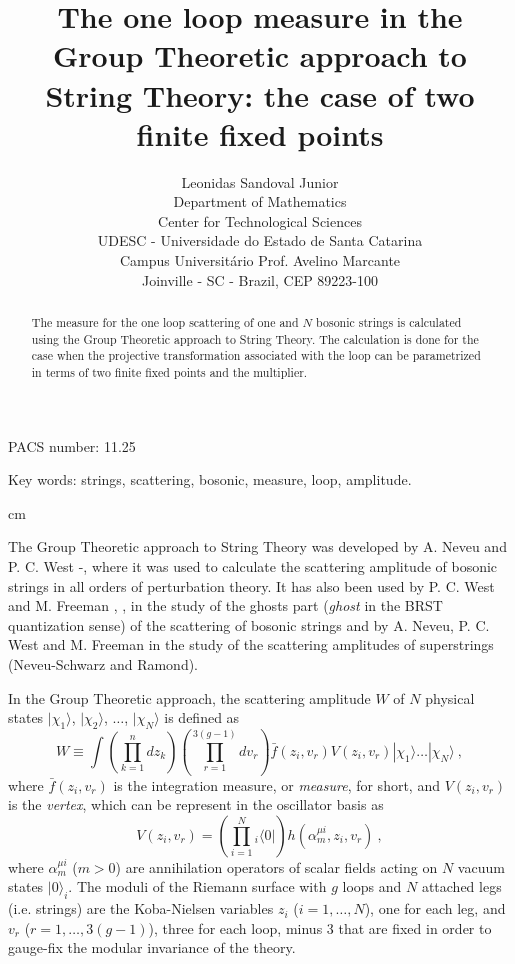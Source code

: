 \documentclass[a4paper,12pt]{article}
\begin{document}
\title{The one loop measure in the Group Theoretic approach to String Theory: the case of two finite fixed points}

\author{Leonidas Sandoval Junior\\ Department of Mathematics\\ Center for Technological
Sciences\\ UDESC - Universidade do Estado de Santa Catarina\\ Campus Universit\'ario Prof.
Avelino Marcante\\ Joinville - SC - Brazil, CEP 89223-100}

\maketitle

\begin{abstract}
The measure for the one loop scattering of one and $N$ bosonic strings is calculated using the Group Theoretic approach to String Theory. The calculation is done for the case when the
projective transformation associated with the loop can be parametrized in terms of two finite fixed points and the multiplier.
\end{abstract}

\noindent PACS number: 11.25

\noindent Key words: strings, scattering, bosonic, measure, loop, amplitude.

 cm

The Group Theoretic approach to String Theory was developed by A. Neveu and P. C. West
\cite{1}-\cite{5}, where it was used to calculate the scattering amplitude of bosonic strings in all orders of perturbation theory. It has also been used by P. C. West and M. Freeman \cite{6}, \cite{7}, in the study of the ghosts part ({\sl ghost} in the BRST quantization sense) of the scattering of bosonic strings and by A. Neveu, P. C. West and M. Freeman \cite{8} in the study of the scattering amplitudes of superstrings (Neveu-Schwarz and Ramond).

In the Group Theoretic approach, the scattering amplitude $W$ of $N$ physical states $|\chi
_1\rangle $, $|\chi _2\rangle $, $\dots $, $|\chi _N\rangle $ is defined as
\begin{equation}
W\equiv \int \left( \prod_{k=1}^ndz_k\right) \left( \prod_{r=1}^{3(g-1)}dv_r\right) \bar
f(z_i,v_r)V(z_i,v_r)|\chi _1\rangle \dots |\chi _N\rangle \ ,
\end{equation}
where $\bar f(z_i,v_r)$ is the integration measure, or {\sl measure}, for short, and
$V(z_i,v_r)$ is the {\sl vertex}, which can be represent in the oscillator basis as
\begin{equation}
V(z_i,v_r)=\left( \prod_{i=1}^N{ }_i\! \langle 0|\right) h(\alpha ^{\mu i}_m,z_i,v_r)\ ,
\end{equation}
where $\alpha ^{\mu i }_m$ ($m>0$) are annihilation operators of scalar fields acting on $N$
vacuum states $|0\rangle _i$. The moduli of the Riemann surface with $g$ loops and $N$
attached legs (i.e. strings) are the Koba-Nielsen variables $z_i$ ($i=1,\dots ,N$), one for
each leg, and $v_r$ ($r=1,\dots ,3(g-1)$), three for each loop, minus 3 that are fixed in
order to gauge-fix the modular invariance of the theory.
\end{document}
